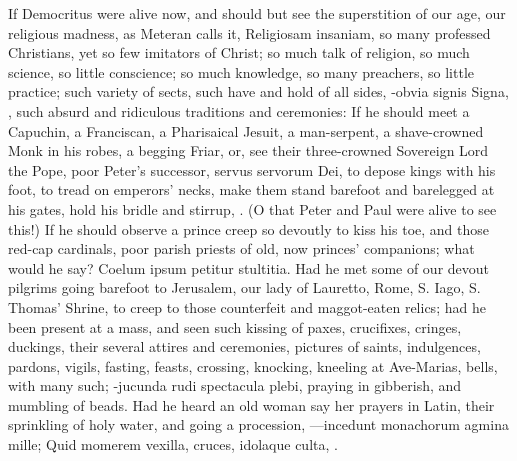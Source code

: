 {If Democritus were alive now, and should but see the superstition of
our age, our religious madness, as Meteran calls it,
Religiosam insaniam, so many professed Christians, yet so few imitators
of Christ; so much talk of religion, so much science, so little
conscience; so much knowledge, so many preachers, so little practice;
such variety of sects, such have and hold of all sides, -obvia
signis Signa, \etc{}, such absurd and ridiculous traditions and
ceremonies: If he should meet a  Capuchin, a Franciscan, a
Pharisaical Jesuit, a man-serpent, a shave-crowned Monk in his robes, a
begging Friar, or, see their three-crowned Sovereign Lord the Pope,
poor Peter's successor, servus servorum Dei, to depose kings with his
foot, to tread on emperors' necks, make them stand barefoot and
barelegged at his gates, hold his bridle and stirrup, \etc{}. (O that Peter
and Paul were alive to see this!) If he should observe a prince
creep so devoutly to kiss his toe, and those red-cap cardinals, poor
parish priests of old, now princes' companions; what would he say?
Coelum ipsum petitur stultitia. Had he met some of our devout pilgrims
going barefoot to Jerusalem, our lady of Lauretto, Rome, S. Iago, S.
Thomas' Shrine, to creep to those counterfeit and maggot-eaten relics;
had he been present at a mass, and seen such kissing of paxes,
crucifixes, cringes, duckings, their several attires and ceremonies,
pictures of saints, indulgences, pardons, vigils, fasting, feasts,
crossing, knocking, kneeling at Ave-Marias, bells, with many such;
-jucunda rudi spectacula plebi, praying in gibberish, and mumbling
of beads. Had he heard an old woman say her prayers in Latin, their
sprinkling of holy water, and going a procession,
---incedunt monachorum agmina mille;
Quid momerem vexilla, cruces, idolaque culta, \etc{}.

}
